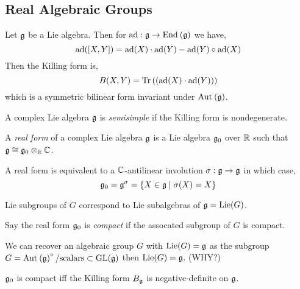 \documentclass[12pt]{article}
\begin{document}
\subsection{Real Algebraic Groups}

\begin{defn}
Let $\mathfrak{g}$ be a Lie algebra. Then for $\mathrm{ad} : \mathfrak{g} \to \mathrm{End}_{} \left( \mathfrak{g} \right)$ we have,
\[ \mathrm{ad}([X,Y]) = \mathrm{ad}(X) \cdot \mathrm{ad}(Y) - \mathrm{ad}(Y) \circ \mathrm{ad}(X) \]
Then the Killing form is,
\[ B(X,Y) = \mathrm{Tr}\left( (\mathrm{ad}(X) \cdot \mathrm{ad}(Y)) \right) \]
which is a symmetric bilinear form invariant under $\mathrm{Aut}_{} \left( \mathfrak{g} \right)$.
\end{defn}

\begin{defn}
A complex Lie algebra $\mathfrak{g}$ is \textit{semisimple} if the Killing form
is nondegenerate. 
\end{defn}

\begin{defn}
A \textit{real form} of a complex Lie algebra $\mathfrak{g}$ is a Lie algebra $\mathfrak{g}_0$ over $\mathbb{R}$ such that $\mathfrak{g} \cong \mathfrak{g}_0 \otimes_{\mathbb{R}} \mathbb{C}$.
\end{defn}

\begin{rmk}
A real form is equivalent to a $\mathbb{C}$-antilinear involution $\sigma : \mathfrak{g} \to \mathfrak{g}$ in which case,
\[ \mathfrak{g}_0 = \mathfrak{g}^{\sigma} = \{ X \in \mathfrak{g} \mid \sigma(X) = X \} \]
\end{rmk}

\newcommand{\Lie}{\mathrm{Lie}}
\newcommand{\inner}[2]{\left< #1 , #2 \right>}

\begin{theorem}
Lie subgroups of $G$ correspond to Lie subalgebras of $\g = \Lie(G)$.
\end{theorem}

\begin{defn}
Say the real form $\mathfrak{g}_0$ is \textit{compact} if the assocated subgroup of $G$ is compact.
\end{defn}

\begin{rmk}
We can recover an algebraic group $G$ with $\Lie(G) = \g$ as the subgroup $G = \mathrm{Aut}_{} \left( \mathfrak{g} \right)^\circ / \text{scalars} \subset \mathrm{GL}(\mathfrak{g})$ then $\Lie(G) = \g$. (WHY?)
\end{rmk}

\begin{lemma}
$\mathfrak{g}_0$ is compact iff the Killing form $B_{\mathfrak{g}}$ is negative-definite on $\mathfrak{g}$. 
\end{lemma}
\end{document}

